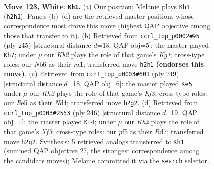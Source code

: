 \documentclass[11pt]{article}
\begin{document}
\clearpage

\begin{figure}[p]\centering
\begin{subfigure}{0.46\textwidth}\centering
\resizebox{\linewidth}{!}{%
\newchessgame
\chessboard[
  setfen={r7/6p1/1N4k1/4Rp1p/7P/6P1/7K/8 w - - 4 123},
  showmover=false,
  pgfstyle=straightmove, color=movearrow, markmove={h2-h1}
]}
\caption{}
\end{subfigure}\hfill
\begin{subfigure}{0.46\textwidth}\centering
\resizebox{\linewidth}{!}{%
\newchessgame
\chessboard[
  setfen={6k1/5p2/4pP2/4P3/4PK2/2r5/8/R7 b - - 62 123},
  showmover=false,
  pgfstyle=straightmove, color=movearrow, markmove={g8-h7}
]}
\caption{}
\end{subfigure}
\\[4pt]
\begin{subfigure}{0.46\textwidth}\centering
\resizebox{\linewidth}{!}{%
\newchessgame
\chessboard[
  setfen={8/8/5kp1/7p/3n3P/2N2PP1/5K2/8 b - - 38 125},
  showmover=false,
  pgfstyle=straightmove, color=movearrow, markmove={f6-e5}
]}
\caption{}
\end{subfigure}\hfill
\begin{subfigure}{0.46\textwidth}\centering
\resizebox{\linewidth}{!}{%
\newchessgame
\chessboard[
  setfen={8/3R4/6kp/7p/7P/r4KP1/8/8 w - - 18 124},
  showmover=false,
  pgfstyle=straightmove, color=movearrow, markmove={f3-f4}
]}
\caption{}
\end{subfigure}
\caption{\textbf{Move 123, White: \texttt{Kh1}.} (a) Our position; Melanie plays \texttt{Kh1} (\texttt{h2h1}). Panels (b)--(d) are the retrieved master positions whose correspondence most drove this move (highest QAP objective among those that transfer to it). (b) Retrieved from \texttt{ccrl\_top\_p0002\#95} (ply 245) [structural distance $d$=18, QAP obj=5]: the master played \texttt{Kh7}; under $\mu$ our \emph{Kh2} plays the role of that game's \emph{Kg1}; cross-type roles: our \emph{N}b6 as their \emph{r}a1; transferred move \texttt{h2h1} \textbf{(endorses this move)}. (c) Retrieved from \texttt{ccrl\_top\_p0003\#601} (ply 249) [structural distance $d$=18, QAP obj=6]: the master played \texttt{Ke5}; under $\mu$ our \emph{Kh2} plays the role of that game's \emph{Kf3}; cross-type roles: our \emph{R}e5 as their \emph{N}d4; transferred move \texttt{h2g2}. (d) Retrieved from \texttt{ccrl\_top\_p0003\#2563} (ply 246) [structural distance $d$=19, QAP obj=4]: the master played \texttt{Kf4}; under $\mu$ our \emph{Kh2} plays the role of that game's \emph{Kf3}; cross-type roles: our \emph{p}f5 as their \emph{R}d7; transferred move \texttt{h2g2}. Synthesis: 5 retrieved analogs transferred to \texttt{Kh1} (summed QAP objective 23, the strongest correspondence among the candidate moves); Melanie committed it via the \texttt{search} selector.}
\label{fig:thought-m244}
\end{figure}
\end{document}
